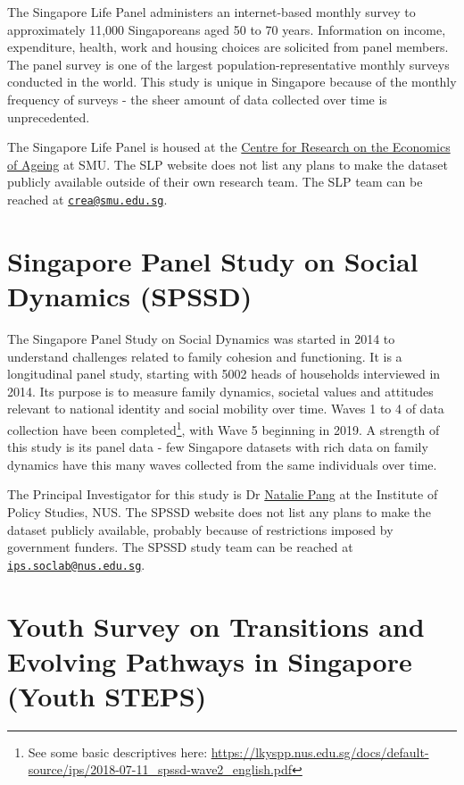 \documentclass[
  openany]{book}
\begin{document}
The Singapore Life Panel administers an internet-based monthly survey to approximately 11,000 Singaporeans aged 50 to 70 years. Information on income, expenditure, health, work and housing choices are solicited from panel members. The panel survey is one of the largest population-representative monthly surveys conducted in the world. This study is unique in Singapore because of the monthly frequency of surveys - the sheer amount of data collected over time is unprecedented.

The Singapore Life Panel is housed at the \href{https://crea.smu.edu.sg/singapore-monthly-panel}{Centre for Research on the Economics of Ageing} at SMU. The SLP website does not list any plans to make the dataset publicly available outside of their own research team. The SLP team can be reached at \href{mailto:crea@smu.edu.sg}{\nolinkurl{crea@smu.edu.sg}}.

\hypertarget{spssd}{%
\section{Singapore Panel Study on Social Dynamics (SPSSD)}\label{spssd}}

The Singapore Panel Study on Social Dynamics was started in 2014 to understand challenges related to family cohesion and functioning. It is a longitudinal panel study, starting with 5002 heads of households interviewed in 2014. Its purpose is to measure family dynamics, societal values and attitudes relevant to national identity and social mobility over time. Waves 1 to 4 of data collection have been completed\footnote{See some basic descriptives here: \url{https://lkyspp.nus.edu.sg/docs/default-source/ips/2018-07-11_spssd-wave2_english.pdf}}, with Wave 5 beginning in 2019. A strength of this study is its panel data - few Singapore datasets with rich data on family dynamics have this many waves collected from the same individuals over time.

The Principal Investigator for this study is Dr \href{https://lkyspp.nus.edu.sg/our-people/faculty/natalie-pang}{Natalie Pang} at the Institute of Policy Studies, NUS. The SPSSD website does not list any plans to make the dataset publicly available, probably because of restrictions imposed by government funders. The SPSSD study team can be reached at \href{mailto:ips.soclab@nus.edu.sg}{\nolinkurl{ips.soclab@nus.edu.sg}}.

\hypertarget{youth-survey-on-transitions-and-evolving-pathways-in-singapore-youth-steps}{%
\section{Youth Survey on Transitions and Evolving Pathways in Singapore (Youth STEPS)}\label{youth-survey-on-transitions-and-evolving-pathways-in-singapore-youth-steps}}
\end{document}
